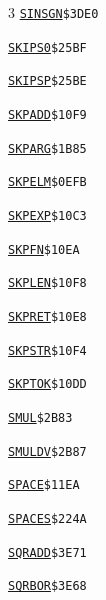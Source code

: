 \begin{multicols}{3}
\noindent\hyperlink{l:SINSGN}{\texttt{SINSGN}}\hfill\texttt{\$3DE0~\phantom{000}\llap{\pageref{l:SINSGN}}}\par
\noindent\hyperlink{l:SKIPS0}{\texttt{SKIPS0}}\hfill\texttt{\$25BF~\phantom{000}\llap{\pageref{l:SKIPS0}}}\par
\noindent\hyperlink{l:SKIPSP}{\texttt{SKIPSP}}\hfill\texttt{\$25BE~\phantom{000}\llap{\pageref{l:SKIPSP}}}\par
\noindent\hyperlink{l:SKPADD}{\texttt{SKPADD}}\hfill\texttt{\$10F9~\phantom{000}\llap{\pageref{l:SKPADD}}}\par
\noindent\hyperlink{l:SKPARG}{\texttt{SKPARG}}\hfill\texttt{\$1B85~\phantom{000}\llap{\pageref{l:SKPARG}}}\par
\noindent\hyperlink{l:SKPELM}{\texttt{SKPELM}}\hfill\texttt{\$0EFB~\phantom{000}\llap{\pageref{l:SKPELM}}}\par
\noindent\hyperlink{l:SKPEXP}{\texttt{SKPEXP}}\hfill\texttt{\$10C3~\phantom{000}\llap{\pageref{l:SKPEXP}}}\par
\noindent\hyperlink{l:SKPFN}{\texttt{SKPFN}}\hfill\texttt{\$10EA~\phantom{000}\llap{\pageref{l:SKPFN}}}\par
\noindent\hyperlink{l:SKPLEN}{\texttt{SKPLEN}}\hfill\texttt{\$10F8~\phantom{000}\llap{\pageref{l:SKPLEN}}}\par
\noindent\hyperlink{l:SKPRET}{\texttt{SKPRET}}\hfill\texttt{\$10E8~\phantom{000}\llap{\pageref{l:SKPRET}}}\par
\noindent\hyperlink{l:SKPSTR}{\texttt{SKPSTR}}\hfill\texttt{\$10F4~\phantom{000}\llap{\pageref{l:SKPSTR}}}\par
\noindent\hyperlink{l:SKPTOK}{\texttt{SKPTOK}}\hfill\texttt{\$10DD~\phantom{000}\llap{\pageref{l:SKPTOK}}}\par
\noindent\hyperlink{l:SMUL}{\texttt{SMUL}}\hfill\texttt{\$2B83~\phantom{000}\llap{\pageref{l:SMUL}}}\par
\noindent\hyperlink{l:SMULDV}{\texttt{SMULDV}}\hfill\texttt{\$2B87~\phantom{000}\llap{\pageref{l:SMULDV}}}\par
\noindent\hyperlink{l:SPACE}{\texttt{SPACE}}\hfill\texttt{\$11EA~\phantom{000}\llap{\pageref{l:SPACE}}}\par
\noindent\hyperlink{l:SPACES}{\texttt{SPACES}}\hfill\texttt{\$224A~\phantom{000}\llap{\pageref{l:SPACES}}}\par
\noindent\hyperlink{l:SQRADD}{\texttt{SQRADD}}\hfill\texttt{\$3E71~\phantom{000}\llap{\pageref{l:SQRADD}}}\par
\noindent\hyperlink{l:SQRBOR}{\texttt{SQRBOR}}\hfill\texttt{\$3E68~\phantom{000}\llap{\pageref{l:SQRBOR}}}\par

\end{multicols}
